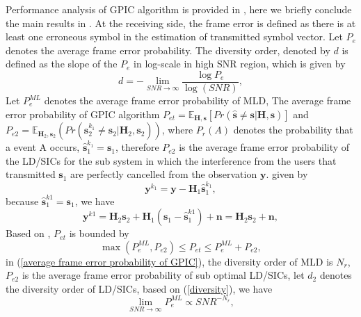 \documentclass[12pt, draftclsnofoot, onecolumn]{IEEEtran}
\begin{document}
Performance analysis of GPIC algorithm is provided in \cite{radji2009interference}, here we briefly conclude the main results in \cite{radji2009interference}. At the receiving side, the frame error is defined as there is at least one erroneous symbol in the estimation of transmitted symbol vector. Let $P_{e}$ denotes the average frame error probability. The diversity order, denoted by $d$ is defined as the slope of the $P_{e}$ in log-scale in high SNR region, which is given by\cite{zheng2003diversity}
\begin{equation}
d=-\lim_{SNR\to\infty}\frac{\log{P_{e}}}{\log(SNR)},
\label{diversity}
\end{equation}
Let $P_{e}^{ML}$ denotes the average frame error probability of MLD, The average frame error probability of GPIC algorithm $P_{et}=\mathbb{E}_{\mathbf{H}, \mathbf{s}}[Pr(\hat{\mathbf{s}}\neq \mathbf{s}|\mathbf{H}, \mathbf{s})]$ and $P_{e2}=\mathbb{E}_{\mathbf{H}_{2}, \mathbf{s}_{2}}(Pr(\hat{\mathbf{s}}^{k_{1}}_{2}\neq \mathbf{s}_{2}|\mathbf{H}_{2}, \mathbf{s}_{2}))$, where $P_{r}(A)$ denotes the probability that a event A occurs, $\hat{\mathbf{s}}_{1}^{k_{1}}=\mathbf{s}_{1}$, therefore $P_{e2}$ is the average frame error probability of the LD/SICs for the sub system in which the interference from the users that transmitted $\mathbf{s}_{1}$ are perfectly cancelled from the observation $\mathbf{y}$. given by
\begin{equation}
\mathbf{y}^{k_{1}}=\mathbf{y}-\mathbf{H}_{1}\hat{\mathbf{s}}_{1}^{k_{1}},
\label{perfect IC}
\end{equation} 
because $\hat{\mathbf{s}}^{k1}_{1}=\mathbf{s}_{1}$, we have
\begin{equation}
\mathbf{y}^{k1}=\mathbf{H}_{2}\mathbf{s}_{2}+\mathbf{H}_{1}(\mathbf{s}_{1}-\hat{\mathbf{s}}_{1}^{k1})+\mathbf{n}=\mathbf{H}_{2}\mathbf{s}_{2}+\mathbf{n},
\label{sub MIMO system}
\end{equation} 
Based on \cite{radji2009interference}, $P_{et}$ is bounded by 
\begin{equation}
\max(P^{ML}_{e}, P_{e2})\leq P_{et}\leq P^{ML}_{e}+P_{e2}, 
\label{average frame error probability of GPIC}
\end{equation}
in (\ref{average frame error probability of GPIC}), the diversity order of MLD is $N_{r}$, $P_{e2}$ is the average frame error probability of sub optimal LD/SICs, let $d_{2}$ denotes the diversity order of LD/SICs, based on (\ref{diversity}), we have 
\begin{equation}
\lim_{SNR\to\infty}P^{ML}_{e}\propto SNR^{-N_{r}},
\label{MLD diversity}
\end{equation}
\end{document}
